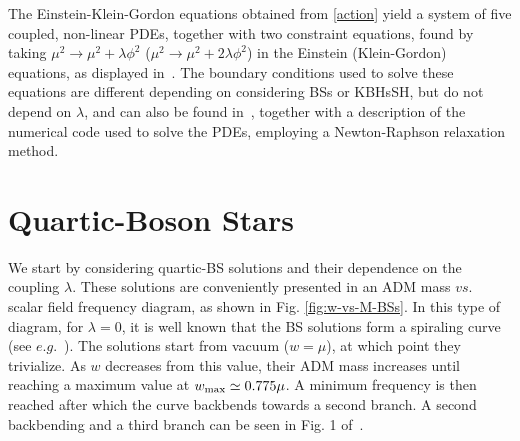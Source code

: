 The Einstein-Klein-Gordon equations obtained from \eqref{action} yield a system of five coupled, non-linear PDEs, together with two constraint equations, found 
by taking $\mu^2\to \mu^2+ \lambda \phi^2$ ($\mu^2\to \mu^2+2\lambda \phi^2$) in the Einstein (Klein-Gordon) equations, as displayed in~\cite{Herdeiro:2015gia}. 
The boundary conditions used to solve these
equations are different depending on considering BSs or KBHsSH, but do not depend on $\lambda$, and can also be found in~\cite{Herdeiro:2015gia}, together with a description of the numerical code used to solve the PDEs, employing a Newton-Raphson relaxation method. 


\section{Quartic-Boson Stars}
\label{sec_II}
We start by considering quartic-BS solutions and their dependence on the coupling $\lambda$. These solutions are  conveniently presented in an ADM mass $vs.$ scalar field frequency diagram, as shown in Fig. \ref{fig:w-vs-M-BSs}. In this type of diagram, for $\lambda=0$, it is well known that the BS solutions form a spiraling curve (see $e.g.$~\cite{Herdeiro:2015gia}). The solutions start from vacuum ($w=\mu$), at which point they trivialize. As $w$ decreases from this value, their ADM mass increases until reaching a maximum value at $w_{\rm max}\simeq 0.775 \mu$. A minimum frequency is then reached after which the curve backbends towards a second branch. A second backbending and a third branch can be seen in  Fig. 1 of~\cite{Herdeiro:2015gia}.







